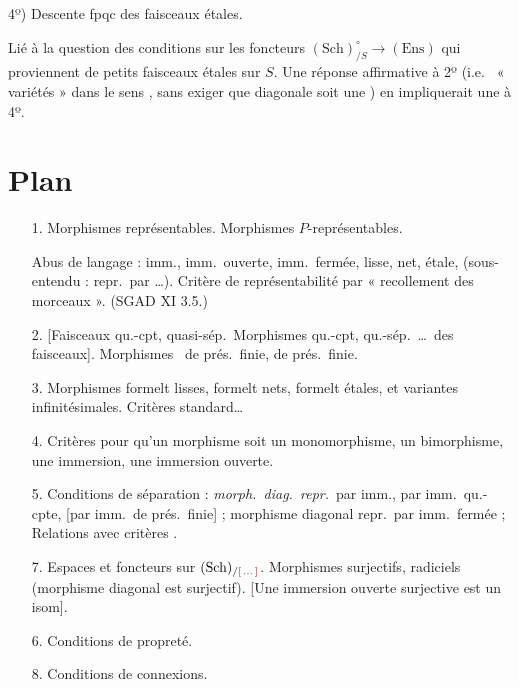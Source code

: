 \documentclass[11pt,a4paper]{article}
\begin{document}
4º) Descente fpqc des  faisceaux étales.

Lié à la question des conditions sur les foncteurs
$(\mathrm{Sch})^{\circ}_{/S} \to (\mathrm{Ens})$ qui proviennent de petits
faisceaux étales sur $S$. Une réponse affirmative à 2º (i.e.\  « variétés » dans le sens , sans exiger que
 diagonale soit une ) en impliquerait une à 4º.


\section*{Plan}



\begin{enumerate}
\item[1.] Morphismes représentables. Morphismes $P$-représentables.

Abus de langage : imm., imm.\ ouverte, imm.\ fermée, lisse, net, étale,
(sous-entendu : repr.\ par …). Critère de représentabilité par
« recollement des morceaux ». (SGAD XI 3.5.)

\item[2.] [Faisceaux qu.-cpt, quasi-sép.\ Morphismes qu.-cpt, qu.-sép.\ …\
des faisceaux]. Morphismes \ de prés.\ finie, de prés.\ finie.


\item[3.] Morphismes formelt lisses, formelt nets,
formel\supplied{lemen}t étales, et variantes infinitésimales. Critères standard…

\item[4.] Critères pour qu'un morphisme soit un monomorphisme, un bimorphisme,
une immersion, une immersion ouverte.

\item[5.] Conditions de séparation : \emph{morph.\ diag.\ repr.}\ par imm.,
par imm.\ qu.-cpte, [par imm.\ de prés.\ finie] ; morphisme diagonal repr.\ par
imm.\ fermée ; Relations avec critères \struck{valutifs} \uncertain{valuatifs}.

\item[7.] Espaces  et foncteurs \struck{\ill{}} sur
$(\mathrm{Sch})_{/\ill{}}$. Morphismes surjectifs, \struck{radiciels} radiciels
(morphisme diagonal est surjectif). [Une immersion ouverte surjective est un
isom].

\item[6.] Conditions de propreté.

\item[8.] Conditions de connexions.
\end{enumerate}
\end{document}
